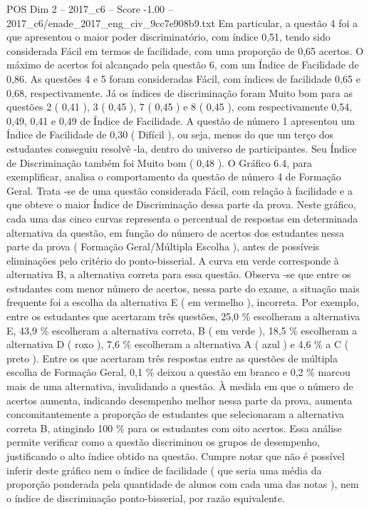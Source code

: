 \begin{textsample}{POS Dim 2 – 2017\_c6 – Score -1.00 – 2017\_c6/enade\_2017\_eng\_civ\_9cc7e908b9.txt}
Em particular, a questão 4 foi a que apresentou o maior poder discriminatório, com índice 0,51, tendo sido considerada Fácil em termos de facilidade, com uma proporção de 0,65 acertos.
O máximo de acertos foi alcançado pela questão 6, com um Índice de Facilidade de 0,86.
As questões 4 e 5 foram consideradas Fácil, com índices de facilidade 0,65 e 0,68, respectivamente.
Já os índices de discriminação foram Muito bom para as questões 2 ( 0,41 ), 3 ( 0,45 ), 7 ( 0,45 ) e 8 ( 0,45 ), com respectivamente 0,54, 0,49, 0,41 e 0,49 de Índice de Facilidade.
A questão de número 1 apresentou um Índice de Facilidade de 0,30 ( Difícil ), ou seja, menos do que um terço dos estudantes conseguiu resolvê -la, dentro do universo de participantes.
Seu Índice de Discriminação também foi Muito bom ( 0,48 ).
O Gráfico 6.4, para exemplificar, analisa o comportamento da questão de número 4 de Formação Geral.
Trata -se de uma questão considerada Fácil, com relação à facilidade e a que obteve o maior Índice de Discriminação dessa parte da prova.
Neste gráfico, cada uma das cinco curvas representa o percentual de respostas em determinada alternativa da questão, em função do número de acertos dos estudantes nessa parte da prova ( Formação Geral/Múltipla Escolha ), antes de possíveis eliminações pelo critério do ponto-bisserial.
A curva em verde corresponde à alternativa B, a alternativa correta para essa questão.
Observa -se que entre os estudantes com menor número de acertos, nessa parte do exame, a situação mais frequente foi a escolha da alternativa E ( em vermelho ), incorreta.
Por exemplo, entre os estudantes que acertaram três questões, 25,0 \% escolheram a alternativa E, 43,9 \% escolheram a alternativa correta, B ( em verde ), 18,5 \% escolheram a alternativa D ( roxo ), 7,6 \% escolheram a alternativa A ( azul ) e 4,6 \% a C ( preto ).
Entre os que acertaram três respostas entre as questões de múltipla escolha de Formação Geral, 0,1 \% deixou a questão em branco e 0,2 \% marcou mais de uma alternativa, invalidando a questão.
À medida em que o número de acertos aumenta, indicando desempenho melhor nessa parte da prova, aumenta concomitantemente a proporção de estudantes que selecionaram a alternativa correta B, atingindo 100 \% para os estudantes com oito acertos.
Essa análise permite verificar como a questão discriminou os grupos de desempenho, justificando o alto índice obtido na questão.
Cumpre notar que não é possível inferir deste gráfico nem o índice de facilidade ( que seria uma média da proporção ponderada pela quantidade de alunos com cada uma das notas ), nem o índice de discriminação ponto-bisserial, por razão equivalente.

\end{textsample}

